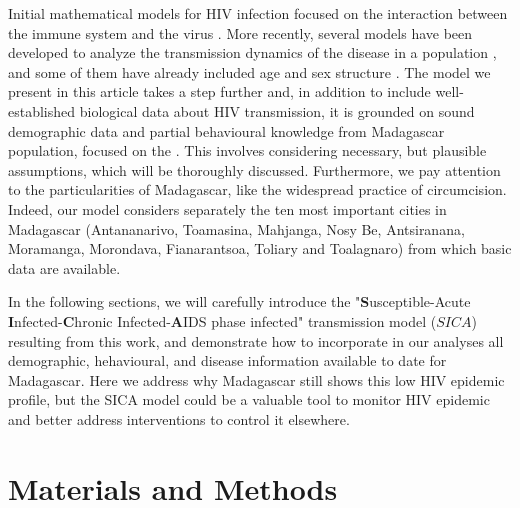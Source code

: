 \documentclass[preprint,12pt]{elsarticle}
\begin{document}
Initial mathematical models for HIV infection focused on the interaction between the immune system and the virus \cite{Nowak01,Keeling08}. More recently, several models have been developed to analyze the transmission dynamics of the disease in a population \cite{Mukandarive2007,MUKANDAVIRE2009,Kim2014,Aldila2018,Omondi2018,Omondi2019}, and some of them have already included age and sex structure \cite{Mukandarive2007,Omondi2018,Omondi2019}. The model we present in this article takes a step further and, in addition to include well-established biological data about HIV transmission, it is grounded on sound demographic data and partial behavioural knowledge from Madagascar population, focused on the . This involves considering necessary, but plausible assumptions, which will be thoroughly discussed.  Furthermore, we pay attention to the particularities of Madagascar, like the widespread practice of circumcision. Indeed, our model considers separately the ten most important cities in Madagascar (Antananarivo, Toamasina, Mahjanga, Nosy Be, Antsiranana, Moramanga, Morondava, Fianarantsoa, Toliary and Toalagnaro) from which basic data are available. 
 \smallskip

 In the following sections, we will carefully introduce the "{\bf S}usceptible-Acute {\bf I}nfected-{\bf C}hronic Infected-{\bf A}IDS phase infected" transmission model ({\bf $SICA$}) resulting from this work, and demonstrate how to incorporate in our analyses all demographic, hehavioural, and disease information available to date for Madagascar. Here we address why Madagascar still shows this low HIV epidemic profile, but the SICA model could be a valuable tool to monitor HIV epidemic and better address interventions to control it elsewhere. 

\section{Materials and Methods}
\end{document}
